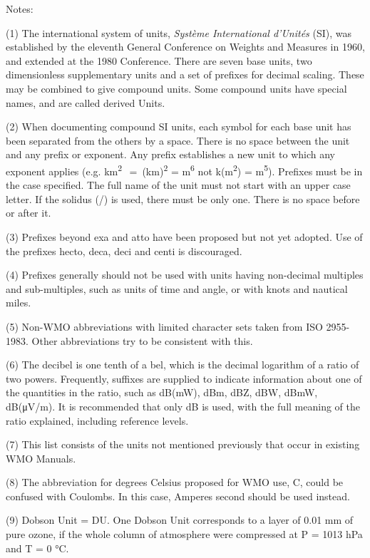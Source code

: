 Notes:

(1) The international system of units, \emph{Système International d'Unités} (SI), was established by the eleventh General Conference on Weights and Measures in 1960, and extended at the 1980 Conference. There are seven base units, two dimensionless supplementary units and a set of prefixes for decimal scaling. These may be combined to give compound units. Some compound units have special names, and are called derived Units.

(2) When documenting compound SI units, each symbol for each base unit has been separated from the others by a space. There is no space between the unit and any prefix or exponent. Any prefix establishes a new unit to which any exponent applies (e.g. km\textsuperscript{2~} =~(km)\textsuperscript{2} = m\textsuperscript{6} not k(m\textsuperscript{2}) = m\textsuperscript{5}). Prefixes must be in the case specified. The full name of the unit must not start with an upper case letter. If the solidus (/) is used, there must be only one. There is no space before or after it.

(3) Prefixes beyond exa and atto have been proposed but not yet adopted. Use of the prefixes hecto, deca, deci and centi is discouraged.

(4) Prefixes generally should not be used with units having non-decimal multiples and sub-multiples, such as units of time and angle, or with knots and nautical miles.

(5) Non-WMO abbreviations with limited character sets taken from ISO 2955-1983. Other abbreviations try to be consistent with this.

(6) The decibel is one tenth of a bel, which is the decimal logarithm of a ratio of two powers. Frequently, suffixes are supplied to indicate information about one of the quantities in the ratio, such as dB(mW), dBm, dBZ, dBW, dBmW, dB(μV/m). It is recommended that only dB is used, with the full meaning of the ratio explained, including reference levels.

(7) This list consists of the units not mentioned previously that occur in existing WMO Manuals.

(8) The abbreviation for degrees Celsius proposed for WMO use, C, could be confused with Coulombs. In this case, Amperes second should be used instead.

(9) Dobson Unit = DU. One Dobson Unit corresponds to a layer of 0.01 mm of pure ozone, if the whole column of atmosphere were compressed at P = 1013 hPa and T = 0 °C.

